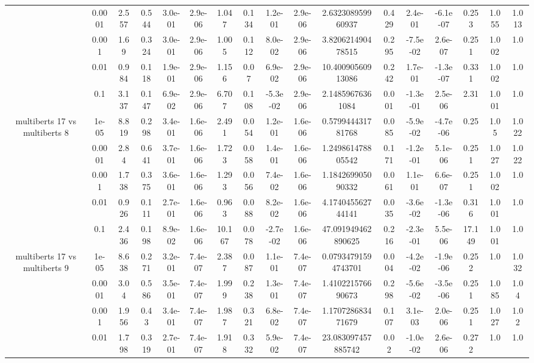 \begin{tabular}{|c|c|c|c|c|c|c|c|c|c|c|c|c|c|c|c|c|}
 & 0.0001 & 2.557 & 0.544 & 3.0e-01 & 2.9e-06 & 1.047 & 0.134 & 1.2e-01 & 2.9e-06 & 2.632308959960937 & 0.429 & 2.4e-01 & -6.1e-07 & 0.253 & 1.055 & 1.013 \\
 & 0.001 & 1.69 & 0.324 & 3.0e-01 & 2.9e-06 & 1.005 & 0.112 & 8.0e-02 & 2.9e-06 & 3.820621490478515 & 0.295 & -7.5e-02 & 2.6e-07 & 0.251 & 1.002 & 1.0 \\
 & 0.01 & 0.984 & 0.118 & 1.9e-01 & 2.9e-06 & 1.156 & 0.07 & 6.9e-02 & 2.9e-06 & 10.40090560913086 & 0.242 & 1.7e-01 & -1.3e-07 & 0.331 & 1.002 & 1.0 \\
 & 0.1 & 3.137 & 0.147 & 6.9e-02 & 2.9e-06 & 6.707 & 0.108 & -5.3e-02 & 2.9e-06 & 2.14859676361084 & 0.001 & -1.3e-01 & 2.5e-06 & 2.31 & 1.001 & 1.0 \\
\hline
\multirow{5}{*}{multiberts 17 vs multiberts 8} & 1e-05 & 8.819 & 0.298 & 3.4e-01 & 1.6e-06 & 2.491 & 0.054 & 1.2e-01 & 1.6e-06 & 0.579944431781768 & 0.085 & -5.9e-02 & -4.7e-06 & 0.25 & 1.05 & 1.022 \\
 & 0.0001 & 2.84 & 0.641 & 3.7e-01 & 1.6e-06 & 1.723 & 0.058 & 1.4e-01 & 1.6e-06 & 1.249861478805542 & 0.171 & -1.2e-01 & 5.1e-06 & 0.251 & 1.027 & 1.022 \\
 & 0.001 & 1.738 & 0.375 & 3.6e-01 & 1.6e-06 & 1.293 & 0.056 & 7.4e-02 & 1.6e-06 & 1.184269905090332 & 0.061 & 1.1e-01 & 6.6e-07 & 0.251 & 1.002 & 1.0 \\
 & 0.01 & 0.926 & 0.111 & 2.7e-01 & 1.6e-06 & 0.963 & 0.088 & 8.2e-02 & 1.6e-06 & 4.174045562744141 & 0.035 & -3.6e-02 & -1.3e-06 & 0.316 & 1.001 & 1.0 \\
 & 0.1 & 2.436 & 0.198 & 8.9e-02 & 1.6e-06 & 10.167 & 0.078 & -2.7e-02 & 1.6e-06 & 47.091949462890625 & 0.216 & -2.3e-01 & 5.5e-06 & 17.149 & 1.001 & 1.0 \\
\hline
\multirow{5}{*}{multiberts 17 vs multiberts 9} & 1e-05 & 8.638 & 0.271 & 3.2e-01 & 7.4e-07 & 2.387 & 0.087 & 1.1e-01 & 7.4e-07 & 0.07934791594743701 & 0.004 & -4.2e-02 & -1.9e-06 & 0.252 & 1.0 & 1.032 \\
 & 0.0001 & 3.04 & 0.586 & 3.5e-01 & 7.4e-07 & 1.999 & 0.238 & 1.3e-01 & 7.4e-07 & 1.410221576690673 & 0.298 & -5.6e-02 & -3.5e-06 & 0.251 & 1.085 & 1.04 \\
 & 0.001 & 1.956 & 0.43 & 3.4e-01 & 7.4e-07 & 1.987 & 0.321 & 6.8e-02 & 7.4e-07 & 1.170728683471679 & 0.107 & 3.1e-03 & 2.0e-06 & 0.251 & 1.027 & 1.02 \\
 & 0.01 & 1.798 & 0.319 & 2.7e-01 & 7.4e-07 & 1.918 & 0.332 & 5.9e-02 & 7.4e-07 & 23.083097457885742 & 0.02 & -1.0e-02 & 2.6e-06 & 0.272 & 1.0 & 1.0 \\

\end{tabular}
